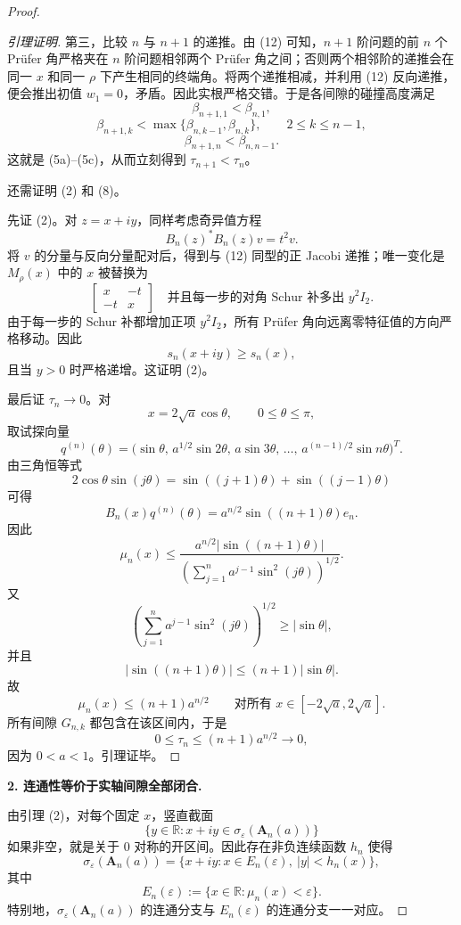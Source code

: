 \documentclass[11pt]{ctexart}
\newcommand{\R}{\mathbb R}
\newcommand{\eps}{\varepsilon}
\newcommand{\A}{\mathbf A}
\begin{document}
\begin{proof}
\begin{proof}[引理证明]
第三，比较 \(n\) 与 \(n+1\) 的递推。由 (12) 可知，\(n+1\) 阶问题的前 \(n\) 个 Prüfer 角严格夹在 \(n\) 阶问题相邻两个 Prüfer 角之间；否则两个相邻阶的递推会在同一 \(x\) 和同一 \(\rho\) 下产生相同的终端角。将两个递推相减，并利用 (12) 反向递推，便会推出初值 \(w_1=0\)，矛盾。因此实根严格交错。于是各间隙的碰撞高度满足
\[
\beta_{n+1,1}<\beta_{n,1},
\]
\[
\beta_{n+1,k}<\max\{\beta_{n,k-1},\beta_{n,k}\},
\qquad 2\le k\le n-1,
\]
\[
\beta_{n+1,n}<\beta_{n,n-1}.
\]
这就是 (5a)--(5c)，从而立刻得到 \(\tau_{n+1}<\tau_n\)。

还需证明 (2) 和 (8)。

先证 (2)。对 \(z=x+iy\)，同样考虑奇异值方程
\[
B_n(z)^*B_n(z)v=t^2v.
\tag{22}
\]
将 \(v\) 的分量与反向分量配对后，得到与 (12) 同型的正 Jacobi 递推；唯一变化是 \(M_\rho(x)\) 中的 \(x\) 被替换为
\[
\begin{bmatrix}
x&-t\\
-t&x
\end{bmatrix}
\quad\text{并且每一步的对角 Schur 补多出 }y^2I_2.
\tag{23}
\]
由于每一步的 Schur 补都增加正项 \(y^2I_2\)，所有 Prüfer 角向远离零特征值的方向严格移动。因此
\[
s_n(x+iy)\ge s_n(x),
\]
且当 \(y>0\) 时严格递增。这证明 (2)。

最后证 \(\tau_n\to0\)。对
\[
x=2\sqrt a\cos\theta,\qquad 0\le\theta\le\pi,
\]
取试探向量
\[
q^{(n)}(\theta)
=
\bigl(
\sin\theta,\,
a^{1/2}\sin2\theta,\,
a\sin3\theta,\,
\dots,\,
a^{(n-1)/2}\sin n\theta
\bigr)^T.
\tag{24}
\]
由三角恒等式
\[
2\cos\theta\sin(j\theta)=\sin((j+1)\theta)+\sin((j-1)\theta)
\]
可得
\[
B_n(x)q^{(n)}(\theta)
=
a^{n/2}\sin((n+1)\theta)e_n.
\tag{25}
\]
因此
\[
\mu_n(x)
\le
\frac{
a^{n/2}|\sin((n+1)\theta)|
}{
\left(\sum_{j=1}^n a^{j-1}\sin^2(j\theta)\right)^{1/2}
}.
\tag{26}
\]
又
\[
\left(\sum_{j=1}^n a^{j-1}\sin^2(j\theta)\right)^{1/2}
\ge |\sin\theta|,
\tag{27}
\]
并且
\[
|\sin((n+1)\theta)|\le (n+1)|\sin\theta|.
\tag{28}
\]
故
\[
\mu_n(x)\le (n+1)a^{n/2}
\qquad
\text{对所有 }x\in[-2\sqrt a,2\sqrt a].
\tag{29}
\]
所有间隙 \(G_{n,k}\) 都包含在该区间内，于是
\[
0\le\tau_n\le (n+1)a^{n/2}\longrightarrow0,
\]
因为 \(0<a<1\)。引理证毕。
\end{proof}

\medskip

\noindent\textbf{2. 连通性等价于实轴间隙全部闭合.}

由引理 (2)，对每个固定 \(x\)，竖直截面
\[
\{y\in\R:x+iy\in\sigma_\eps(\A_n(a))\}
\]
如果非空，就是关于 \(0\) 对称的开区间。因此存在非负连续函数 \(h_n\) 使得
\[
\sigma_\eps(\A_n(a))
=
\{x+iy:x\in E_n(\eps),\ |y|<h_n(x)\},
\tag{30}
\]
其中
\[
E_n(\eps):=\{x\in\R:\mu_n(x)<\eps\}.
\tag{31}
\]
特别地，\(\sigma_\eps(\A_n(a))\) 的连通分支与 \(E_n(\eps)\) 的连通分支一一对应。


\end{proof}
\end{document}
